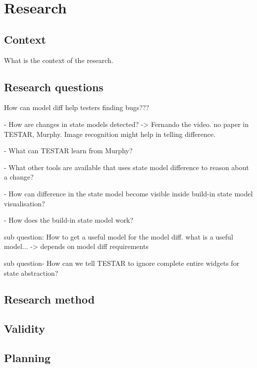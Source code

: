 \section{Research}

\subsection{Context}
What is the context of the research. 

\subsection{Research questions}


How can model diff help testers finding bugs???


- How are changes in state models detected? -> Fernando the video. no paper in TESTAR, Murphy. Image recognition might help in telling difference. 

- What can TESTAR learn from Murphy?

- What other tools are available that uses state model difference to reason about a change? 

- How can difference in the state model become visible inside build-in state model visualisation?

- How does the build-in state model work?

sub question: How to get a useful model for the model diff.
what is a useful model... -> depends on model diff requirements

sub question- How can we tell TESTAR to ignore complete entire widgets for state abstraction?


\subsection{Research method}

\subsection{Validity}

\subsection{Planning}